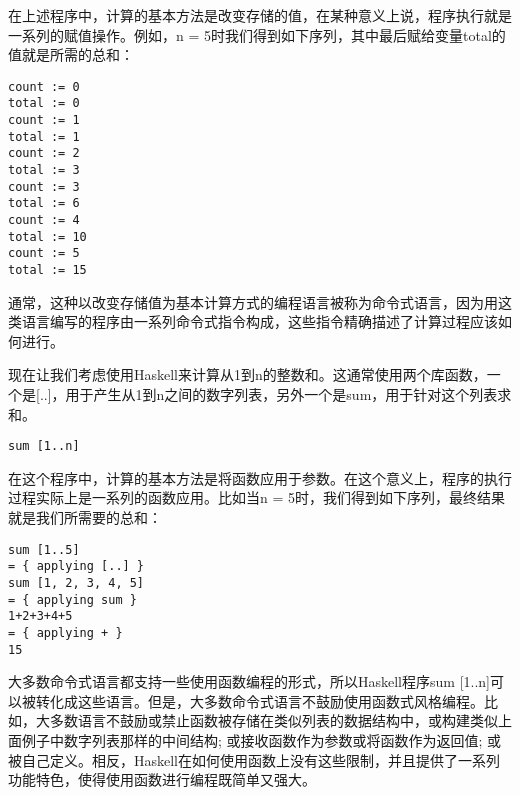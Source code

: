 在上述程序中，计算的基本方法是改变存储的值，在某种意义上说，程序执行就是一系列的赋值操作。例如，n
= 5时我们得到如下序列，其中最后赋给变量total的值就是所需的总和：

\begin{verbatim}
count := 0
total := 0
count := 1
total := 1
count := 2
total := 3
count := 3
total := 6
count := 4
total := 10
count := 5
total := 15
\end{verbatim}

通常，这种以改变存储值为基本计算方式的编程语言被称为命令式语言，因为用这类语言编写的程序由一系列命令式指令构成，这些指令精确描述了计算过程应该如何进行。

现在让我们考虑使用Haskell来计算从1到n的整数和。这通常使用两个库函数，一个是[..]，用于产生从1到n之间的数字列表，另外一个是sum，用于针对这个列表求和。 

\begin{verbatim}
sum [1..n]
\end{verbatim}

在这个程序中，计算的基本方法是将函数应用于参数。在这个意义上，程序的执行过程实际上是一系列的函数应用。比如当n = 5时，我们得到如下序列，最终结果就是我们所需要的总和：

\begin{verbatim}
sum [1..5]
= { applying [..] }
sum [1, 2, 3, 4, 5]
= { applying sum }
1+2+3+4+5
= { applying + }
15
\end{verbatim}

大多数命令式语言都支持一些使用函数编程的形式，所以Haskell程序sum [1..n]可以被转化成这些语言。但是，大多数命令式语言不鼓励使用函数式风格编程。比如，大多数语言不鼓励或禁止函数被存储在类似列表的数据结构中，或构建类似上面例子中数字列表那样的中间结构; 或接收函数作为参数或将函数作为返回值; 或被自己定义。相反，Haskell在如何使用函数上没有这些限制，并且提供了一系列功能特色，使得使用函数进行编程既简单又强大。

